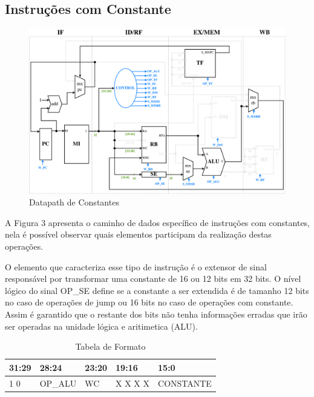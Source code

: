\documentclass{report}
\begin{document}
\subsection{Instruções com Constante}
\begin{figure}[H]
\centering
\includegraphics[width=\textwidth]{./pictures/DatapathCONS.pdf}
\caption{Datapath de Constantes}
\end{figure}
A Figura 3 apresenta o caminho de dados específico de instruções com constantes, nela é possível observar quais elementos participam da realização destas operações.\newline

O elemento que caracteriza esse tipo de instrução é o extensor de sinal responsável por transformar uma constante de 16 ou 12 bits em 32 bits. O nível lógico do sinal OP\_SE define se a constante a ser extendida é de tamanho 12 bits no caso de operações de jump ou 16 bits no caso de operações com constante. Assim é garantido que o restante dos bits não tenha informações erradas que irão ser operadas na unidade lógica e aritimetica (ALU).

\FloatBarrier
\begin{table}[H]
  \begin{center}
  \renewcommand{\arraystretch}{1.2}
    \begin{tabular}[pos]{|>{\centering\arraybackslash}m{35pt}|>{\centering\arraybackslash}m{57pt}|>{\centering\arraybackslash}m{46pt}|>{\centering\arraybackslash}m{46pt}|>{\centering\arraybackslash}m{180pt}|} \hline
      \cellcolor[gray]{0.9}\textbf{31:29} & \cellcolor[gray]{0.9}\textbf{28:24} & \cellcolor[gray]{0.9}\textbf{23:20} & \cellcolor[gray]{0.9}\textbf{19:16} & \cellcolor[gray]{0.9}\textbf{15:0} \\ \hline
        0 1 0       & OP\_ALU        & WC        & X X X X      & CONSTANTE \\ \hline
    \end{tabular}
    \caption{Tabela de Formato}
  \end{center}
\end{table}  
\end{document}
